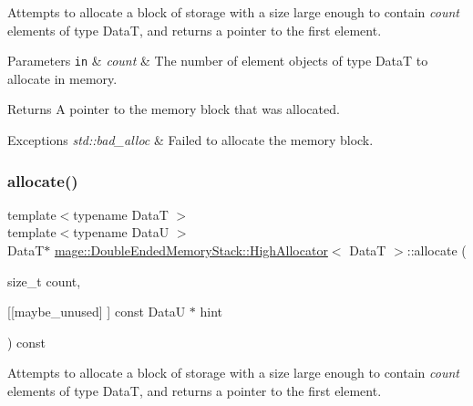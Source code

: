 Attempts to allocate a block of storage with a size large enough to contain {\itshape count} elements of type {\ttfamily DataT}, and returns a pointer to the first element.


\begin{DoxyParams}[1]{Parameters}
\mbox{\tt in}  & {\em count} & The number of element objects of type {\ttfamily DataT} to allocate in memory. \\
\hline
\end{DoxyParams}
\begin{DoxyReturn}{Returns}
A pointer to the memory block that was allocated. 
\end{DoxyReturn}

\begin{DoxyExceptions}{Exceptions}
{\em std\+::bad\+\_\+alloc} & Failed to allocate the memory block. \\
\hline
\end{DoxyExceptions}
\hypertarget{structmage_1_1_double_ended_memory_stack_1_1_high_allocator_aa7dd068405263cadbe9ecaeffa5a6500}{}\label{structmage_1_1_double_ended_memory_stack_1_1_high_allocator_aa7dd068405263cadbe9ecaeffa5a6500} 
\subsubsection{\texorpdfstring{allocate()}{allocate()}\hspace{0.1cm}{\footnotesize\ttfamily [2/2]}}
{\footnotesize\ttfamily template$<$typename DataT $>$ \\
template$<$typename DataU $>$ \\
DataT$\ast$ \hyperlink{structmage_1_1_double_ended_memory_stack_1_1_high_allocator}{mage\+::\+Double\+Ended\+Memory\+Stack\+::\+High\+Allocator}$<$ DataT $>$\+::allocate (\begin{DoxyParamCaption}\item[{size\+\_\+t}]{count,  }\item[{\mbox{[}\mbox{[}maybe\+\_\+unused\mbox{]} \mbox{]} const DataU $\ast$}]{hint }\end{DoxyParamCaption}) const}

Attempts to allocate a block of storage with a size large enough to contain {\itshape count} elements of type {\ttfamily DataT}, and returns a pointer to the first element.


